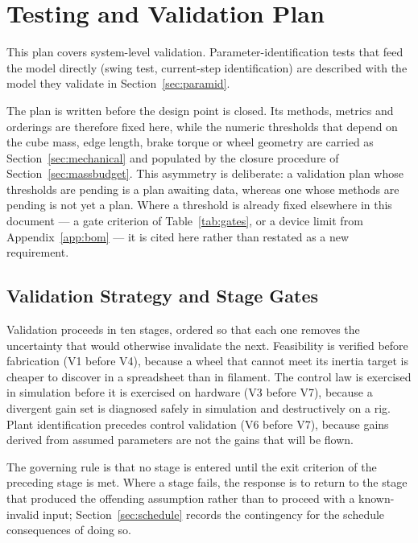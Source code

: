 \section{Testing and Validation Plan}
\label{sec:testing}

This plan covers system-level validation. Parameter-identification tests that
feed the model directly (swing test, current-step identification) are described
with the model they validate in Section~\ref{sec:paramid}.

The plan is written before the design point is closed. Its methods, metrics and
orderings are therefore fixed here, while the numeric thresholds that depend on
the cube mass, edge length, brake torque or wheel geometry are carried as
Section~\ref{sec:mechanical} and populated by the closure procedure of
Section~\ref{sec:massbudget}. This asymmetry is deliberate: a validation plan
whose thresholds are pending is a plan awaiting data, whereas one whose methods
are pending is not yet a plan. Where a threshold is already fixed elsewhere in
this document --- a gate criterion of Table~\ref{tab:gates}, or a device limit
from Appendix~\ref{app:bom} --- it is cited here rather than restated as a new
requirement.

\subsection{Validation Strategy and Stage Gates}
\label{sec:test_strategy}

Validation proceeds in ten stages, ordered so that each one removes the
uncertainty that would otherwise invalidate the next. Feasibility is verified before
fabrication (V1 before V4), because a wheel that cannot meet its inertia target
is cheaper to discover in a spreadsheet than in filament. The control law is
exercised in simulation before it is exercised on hardware (V3 before V7),
because a divergent gain set is diagnosed safely in simulation and destructively
on a rig. Plant identification precedes control validation (V6 before V7),
because gains derived from assumed parameters are not the gains that will be
flown.

The governing rule is that no stage is entered until the exit criterion of the
preceding stage is met. Where a stage fails, the response is to return to the
stage that produced the offending assumption rather than to proceed with a
known-invalid input; Section~\ref{sec:schedule} records the contingency for the
schedule consequences of doing so.

